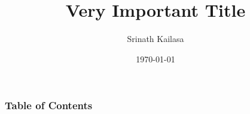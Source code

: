 \documentclass{beamer}
\title{Very Important Title}
\author{Srinath Kailasa}
\institute{Department of Mathematics\\University College London}
\date{\today}
\begin{document}
\frame{\titlepage}

\begin{frame}
\frametitle{Table of Contents}
\tableofcontents
\end{frame}




\end{document}
